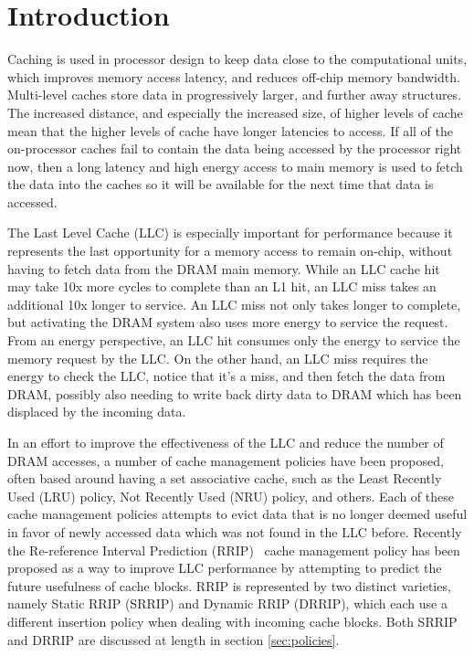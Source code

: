\section{Introduction}

Caching is used in processor design to keep data close to the
computational units, which improves memory access latency, and reduces off-chip memory bandwidth.  Multi-level
caches store data in progressively larger,
and further away structures.  The increased distance, and especially
the increased size, of higher levels of cache mean that the higher
levels of cache have longer latencies to access.  If all of the
on-processor caches fail to contain the data being accessed by the
processor right now, then a long latency and high energy access to
main memory is used to fetch the data into the caches so it will be
available for the next time that data is accessed.

The Last Level Cache (LLC) is especially important for performance
because it represents the last opportunity for a memory access to
remain on-chip, without having to fetch data from the DRAM main
memory.  While an LLC cache hit may take 10x more cycles to complete
than an L1 hit, an LLC miss takes an additional 10x longer to
service.  An LLC miss not only takes longer to complete, but
activating the
DRAM system also uses more energy to service the request.  From an
energy perspective, an LLC hit consumes only the energy to service the
memory request by the LLC.  On the other hand, an LLC miss requires
the energy to
check the LLC, notice that it's a miss, and then fetch the data from
DRAM, possibly also needing to write back dirty data to DRAM which has been
displaced by the incoming data. 

In an effort to improve the effectiveness of the LLC and reduce the
number of DRAM accesses, a number of cache management policies have
been proposed, often based around having a set associative cache, such
as the Least Recently Used (LRU) policy, Not Recently Used
(NRU) policy, and others.  Each of these cache management policies
attempts to
evict data that is no longer deemed useful in favor of newly accessed
data which was not found in the LLC before.  Recently the
Re-reference Interval Prediction (RRIP)~\cite{jaleeltheobald10} cache
management policy has
been proposed as a way to improve LLC performance by attempting to
predict the future usefulness of cache blocks.  RRIP is represented by
two distinct varieties, namely Static RRIP (SRRIP) and Dynamic RRIP (DRRIP), which
each use a different insertion policy when dealing with incoming
cache blocks.  Both SRRIP and DRRIP are discussed at length in section
\ref{sec:policies}.


